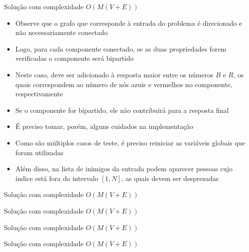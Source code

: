 \begin{frame}[fragile]{Solução com complexidade $O(M(V + E))$}

    \begin{itemize}
        \item Observe que o grafo que corresponde à entrada do problema é direcionado e não 
            necessariamente conectado

        \item Logo, para cada componente conectado, se as duas propriedades forem verificadas
            o componente será bipartido

        \item Neste caso, deve ser adicionado à resposta maior entre os números $B$ e $R$, os 
            quais correspondem ao número de nós azuis e vermelhos no componente, respectivamente
        
        \item Se o componente for bipartido, ele não contribuirá para a resposta final

        \item É preciso tomar, porém, alguns cuidados na implementação

        \item Como são múltiplos casos de teste, é preciso reiniciar as variáveis globais que
            foram utilizadas

        \item Além disso, na lista de inimigos da entrada podem aparecer pessoas cujo índice 
            está fora do intervalo $[1, N]$, as quais devem ser desprezadas
   \end{itemize}

\end{frame}

\begin{frame}[fragile]{Solução com complexidade $O(M(V + E))$}
\end{frame}

\begin{frame}[fragile]{Solução com complexidade $O(M(V + E))$}
\end{frame}

\begin{frame}[fragile]{Solução com complexidade $O(M(V + E))$}
\end{frame}

\begin{frame}[fragile]{Solução com complexidade $O(M(V + E))$}
\end{frame}
